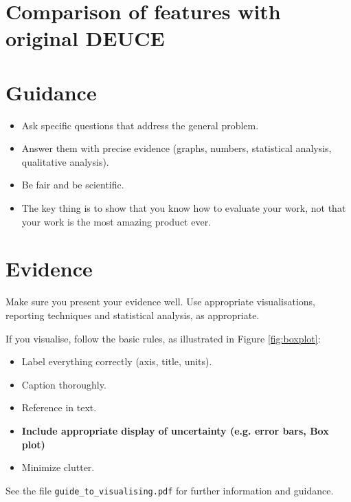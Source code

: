 \documentclass{l4proj}
\begin{document}
\section{Comparison of features with original DEUCE}
\section{Guidance}
\begin{itemize}
    \item
        Ask specific questions that address the general problem.
    \item
        Answer them with precise evidence (graphs, numbers, statistical
        analysis, qualitative analysis).
    \item
        Be fair and be scientific.
    \item
        The key thing is to show that you know how to evaluate your work, not
        that your work is the most amazing product ever.
\end{itemize}

\section{Evidence}
Make sure you present your evidence well. Use appropriate visualisations, reporting techniques and statistical analysis, as appropriate.

If you visualise, follow the basic rules, as illustrated in Figure \ref{fig:boxplot}:
\begin{itemize}
\item Label everything correctly (axis, title, units).
\item Caption thoroughly.
\item Reference in text.
\item \textbf{Include appropriate display of uncertainty (e.g. error bars, Box plot)}
\item Minimize clutter.
\end{itemize}

See the file \texttt{guide\_to\_visualising.pdf} for further information and guidance.
\end{document}
